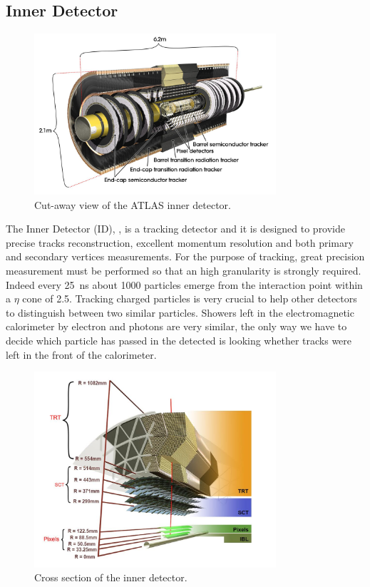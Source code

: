 \subsection{Inner Detector}
\label{sec:ID}
\begin{figure}[tp]
\centering
\includegraphics[width=0.8\textwidth]{LHC_ATLAS/ID}
\caption{Cut-away view of the ATLAS inner detector.}
\label{fig:id}
\end{figure}

The Inner Detector (ID), \Fig{\ref{fig:id}}, is a tracking detector and it is designed to provide precise tracks reconstruction, excellent momentum resolution and both primary and secondary vertices measurements. For the purpose of tracking, great precision measurement must be performed so that an high granularity is strongly required. Indeed every \SI{25}{\ns} about \num{1000} particles emerge from the interaction point within a $\eta$ cone of \num{2.5}. Tracking charged particles is very crucial to help other detectors to distinguish between two similar particles. Showers left in the electromagnetic calorimeter by electron and photons are very similar, the only way we have to decide which particle has passed in the detected is looking whether tracks were left in the front of the calorimeter.

\begin{figure}[pt]
\centering
\includegraphics[width=0.8\textwidth]{LHC_ATLAS/IDCrossSection}
\caption{Cross section of the inner detector.}
\label{fig:xsecID}
\end{figure}

